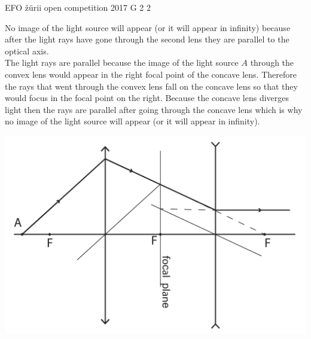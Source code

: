 \documentclass[11pt]{article}
\begin{document}
{EFO žürii} %
{open competition} %
{2017} %
{G 2} %
{2} %
{

\ifEngSolution
No image of the light source will appear (or it will appear in infinity) because after the light rays have gone through the second lens they are parallel to the optical axis.\\
The light rays are parallel because the image of the light source $A$ through the convex lens would appear in the right focal point of the concave lens. Therefore the rays that went through the convex lens fall on the concave lens so that they would focus in the focal point on the right. Because the concave lens diverges light then the rays are parallel after going through the concave lens which is why no image of the light source will appear (or it will appear in infinity).
\begin{center}
	\includegraphics[width=0.7\linewidth]{2017-lahg-02-valgusallikaslah_ing}
\end{center}
\fi
}
\end{document}
